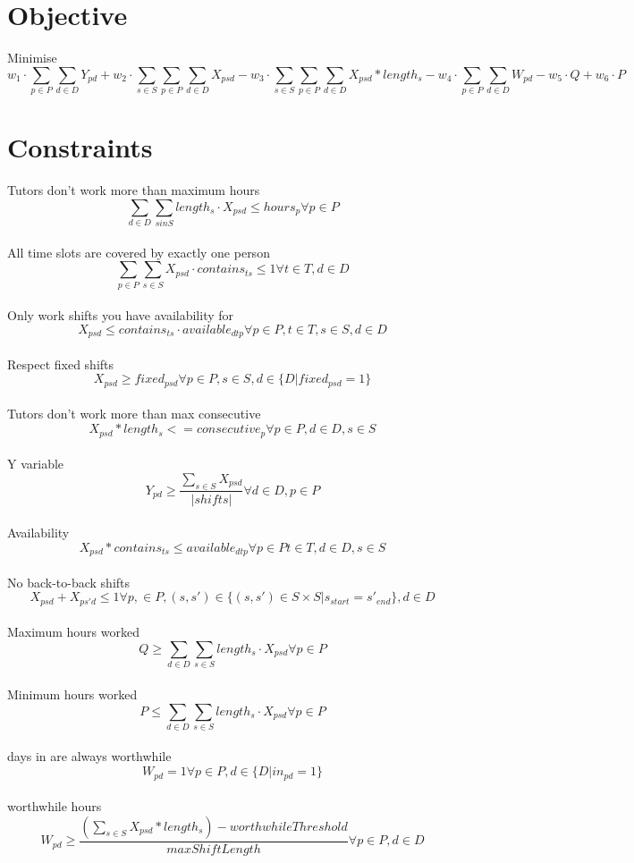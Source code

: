 \documentclass{article}
\begin{document}
\section*{Objective}
Minimise 
\[w_1 \cdot \sum_{p \in P} \sum_{d \in D} Y_{pd} + w_2 \cdot \sum_{s \in S} \sum_{p \in P} \sum_{d \in D} X_{psd} - w_3 \cdot \sum_{s \in S} \sum_{p \in P} \sum_{d \in D} X_{psd} * length_{s} - w_4 \cdot \sum_{p \in P} \sum_{d \in D} W_{pd} - w_5 \cdot Q + w_6 \cdot P\] %

\section*{Constraints}
Tutors don't work more than maximum hours
\[\sum_{d \in D} \sum_{s in S} length_s \cdot X_{psd} \leq hours_p \forall p \in P\] \\

All time slots are covered by exactly one person %
\[\sum_{p \in P} \sum_{s \in S} X_{psd} \cdot contains_{ts} \leq 1 \forall t \in T, d \in D\] \\

Only work shifts you have availability for %
\[X_{psd} \leq contains_{ts} \cdot available_{dtp} \forall p \in P, t \in T, s \in S, d \in D\] \\

Respect fixed shifts
\[X_{psd} \geq fixed_{psd} \forall p \in P, s \in S, d \in \{D | fixed_{psd} = 1\}\] \\

Tutors don't work more than max consecutive
\[X_{psd} * length_{s} <= consecutive_{p} \forall p \in P, d \in D, s \in S\] \\

Y variable
\[Y_{pd} \geq \frac{\sum_{s \in S} X_{psd}}{|shifts|}  \forall d \in D, p \in P\] \\

Availability
\[X_{psd} * contains_{ts} \leq available_{dtp} \forall p \in P t \in T, d \in D, s \in S\] \\

No back-to-back shifts
\[X_{psd} + X_{ps'd} \leq 1 \forall p, \in P, (s, s') \in \{(s, s') \in  S \times S | s_{start} = s'_{end}\}, d \in D \] \\

Maximum hours worked
\[Q \geq \sum_{d \in D} \sum_{s \in S} length_s \cdot X_{psd} \forall p \in P\] \\

Minimum hours worked
\[P \leq \sum_{d \in D} \sum_{s \in S} length_s \cdot X_{psd} \forall p \in P\] \\

days in are always worthwhile
\[W_{pd} = 1 \forall p \in P, d \in \{D | in_{pd} = 1\}\] \\

worthwhile hours
\[W_{pd} \geq \frac{(\sum_{s \in S} X_{psd} * length_s) - worthwhileThreshold}{maxShiftLength} \forall p \in P, d \in D\] \\
\end{document}
